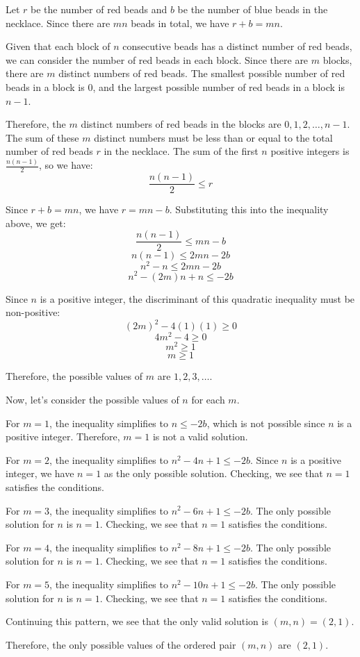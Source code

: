 Let $r$ be the number of red beads and $b$ be the number of blue beads in the necklace. Since there are $mn$ beads in total, we have $r+b=mn$.

Given that each block of $n$ consecutive beads has a distinct number of red beads, we can consider the number of red beads in each block. Since there are $m$ blocks, there are $m$ distinct numbers of red beads. The smallest possible number of red beads in a block is $0$, and the largest possible number of red beads in a block is $n-1$.

Therefore, the $m$ distinct numbers of red beads in the blocks are $0, 1, 2, \ldots, n-1$. The sum of these $m$ distinct numbers must be less than or equal to the total number of red beads $r$ in the necklace. The sum of the first $n$ positive integers is $\frac{n(n-1)}{2}$, so we have:
$$\frac{n(n-1)}{2} \leq r$$

Since $r+b=mn$, we have $r=mn-b$. Substituting this into the inequality above, we get:
$$\frac{n(n-1)}{2} \leq mn-b$$
$$n(n-1) \leq 2mn-2b$$
$$n^2-n \leq 2mn-2b$$
$$n^2-(2m)n+n \leq -2b$$

Since $n$ is a positive integer, the discriminant of this quadratic inequality must be non-positive:
$$(2m)^2-4(1)(1) \geq 0$$
$$4m^2-4 \geq 0$$
$$m^2 \geq 1$$
$$m \geq 1$$

Therefore, the possible values of $m$ are $1, 2, 3, \ldots$.

Now, let's consider the possible values of $n$ for each $m$.

For $m=1$, the inequality simplifies to $n \leq -2b$, which is not possible since $n$ is a positive integer. Therefore, $m=1$ is not a valid solution.

For $m=2$, the inequality simplifies to $n^2-4n+1 \leq -2b$. Since $n$ is a positive integer, we have $n=1$ as the only possible solution. Checking, we see that $n=1$ satisfies the conditions.

For $m=3$, the inequality simplifies to $n^2-6n+1 \leq -2b$. The only possible solution for $n$ is $n=1$. Checking, we see that $n=1$ satisfies the conditions.

For $m=4$, the inequality simplifies to $n^2-8n+1 \leq -2b$. The only possible solution for $n$ is $n=1$. Checking, we see that $n=1$ satisfies the conditions.

For $m=5$, the inequality simplifies to $n^2-10n+1 \leq -2b$. The only possible solution for $n$ is $n=1$. Checking, we see that $n=1$ satisfies the conditions.

Continuing this pattern, we see that the only valid solution is $(m,n) = (2,1)$.

Therefore, the only possible values of the ordered pair $(m, n)$ are $(2, 1)$.
